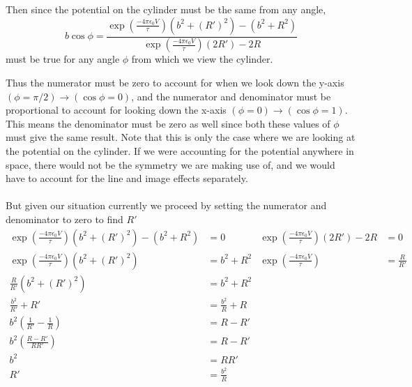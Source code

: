 \documentclass{article}
\begin{document}
Then since the potential on the cylinder must be the same from any angle,
\[ b\cos\phi = \frac{\exp\left(\frac{-4\pi\epsilon_{0}V}{\tau}\right)(b^{2} + (R')^{2}) - (b^{2} + R^{2})}{\exp\left(\frac{-4\pi\epsilon_{0}V}{\tau}\right)(2R') - 2R} \]
must be true for any angle $\phi$ from which we view the cylinder.

Thus the numerator must be zero to account for when we look down the y-axis $(\phi=\pi/2)\to(\cos\phi=0)$, and the numerator and denominator must be proportional to account for looking down the x-axis $(\phi=0)\to(\cos\phi=1)$. This means the denominator must be zero as well since both these values of $\phi$ must give the same result. Note that this is only the case where we are looking at the potential on the cylinder. If we were accounting for the potential anywhere in space, there would not be the symmetry we are making use of, and we would have to account for the line and image effects separately.

\paragraph{}
But given our situation currently we proceed by setting the numerator and denominator to zero to find $R'$
\begin{align*}
\exp\left(\frac{-4\pi\epsilon_{0}V}{\tau}\right)(b^{2} + (R')^{2}) - (b^{2} + R^{2}) &= 0 & \exp\left(\frac{-4\pi\epsilon_{0}V}{\tau}\right)(2R') - 2R&=0\\
\exp\left(\frac{-4\pi\epsilon_{0}V}{\tau}\right)(b^{2} + (R')^{2}) &= b^{2} + R^{2} & \exp\left(\frac{-4\pi\epsilon_{0}V}{\tau}\right)&=\frac{R}{R'}\\
\frac{R}{R'}(b^{2} + (R')^{2}) &= b^{2} + R^{2}\\
\frac{b^{2}}{R'} + R' &= \frac{b^{2}}{R} + R\\
b^{2} \left(\frac{1}{R'} - \frac{1}{R}\right) &= R - R'\\
b^{2} \left(\frac{R-R'}{RR'}\right) &= R - R'\\
b^{2} &= RR'\\
R' &= \boxed{\frac{b^{2}}{R}}
\end{align*}
\end{document}
